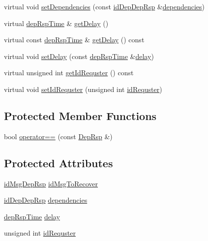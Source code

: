 \begin{DoxyCompactItemize}
\item 
virtual void \hyperlink{class_dep_rsp_ab144b3866dd1a527842806ced90495f6}{set\+Dependencies} (const \hyperlink{dep_rsp__m_8h_a3c2ceb107008eb344443aaab2eb872b8}{id\+Dep\+Dep\+Rsp} \&\hyperlink{class_dep_rsp_a0881ee52098e202a4486da80efa6ce1f}{dependencies})
\item 
virtual \hyperlink{dep_rsp__m_8h_ab118b8474723cf26f98151aae3d55940}{dep\+Rsp\+Time} \& \hyperlink{class_dep_rsp_a89f0b26c269083713702386392f82c45}{get\+Delay} ()
\item 
virtual const \hyperlink{dep_rsp__m_8h_ab118b8474723cf26f98151aae3d55940}{dep\+Rsp\+Time} \& \hyperlink{class_dep_rsp_a8badf32e7f81c0ec7a9b4eb22fb83c0a}{get\+Delay} () const
\item 
virtual void \hyperlink{class_dep_rsp_a582682e76c175afb882cf50d2b423501}{set\+Delay} (const \hyperlink{dep_rsp__m_8h_ab118b8474723cf26f98151aae3d55940}{dep\+Rsp\+Time} \&\hyperlink{class_dep_rsp_a9b383b175e0b581e1558b2dc34a21b7a}{delay})
\item 
virtual unsigned int \hyperlink{class_dep_rsp_a3c858b0cb735e9e6309e8bf25bf272dd}{get\+Id\+Requster} () const
\item 
virtual void \hyperlink{class_dep_rsp_a7029f3c6f0e1b230965a0143a3c9724e}{set\+Id\+Requster} (unsigned int \hyperlink{class_dep_rsp_ae8c6f097db47049e4cb84e6788f9d58d}{id\+Requster})
\end{DoxyCompactItemize}
\subsection*{Protected Member Functions}
\begin{DoxyCompactItemize}
\item 
bool \hyperlink{class_dep_rsp_a4796a7a035aa6f4b9deb40498731a941}{operator==} (const \hyperlink{class_dep_rsp}{Dep\+Rsp} \&)
\end{DoxyCompactItemize}
\subsection*{Protected Attributes}
\begin{DoxyCompactItemize}
\item 
\hyperlink{dep_rsp__m_8h_a8a41011e0821f196429cd4bc45638bcf}{id\+Msg\+Dep\+Rsp} \hyperlink{class_dep_rsp_a7b777428e859ba7a6f083e13f6431cf4}{id\+Msg\+To\+Recover}
\item 
\hyperlink{dep_rsp__m_8h_a3c2ceb107008eb344443aaab2eb872b8}{id\+Dep\+Dep\+Rsp} \hyperlink{class_dep_rsp_a0881ee52098e202a4486da80efa6ce1f}{dependencies}
\item 
\hyperlink{dep_rsp__m_8h_ab118b8474723cf26f98151aae3d55940}{dep\+Rsp\+Time} \hyperlink{class_dep_rsp_a9b383b175e0b581e1558b2dc34a21b7a}{delay}
\item 
unsigned int \hyperlink{class_dep_rsp_ae8c6f097db47049e4cb84e6788f9d58d}{id\+Requster}
\end{DoxyCompactItemize}
